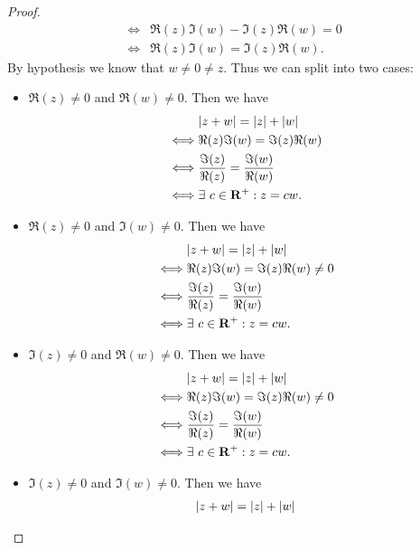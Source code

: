 \begin{proof}
\begin{align*}
        \iff & \Re(z) \Im(w) - \Im(z) \Re(w) = 0                                                                               \\
        \iff & \Re(z) \Im(w) = \Im(z) \Re(w).
    \end{align*}
    By hypothesis we know that \(w \neq 0 \neq z\).
    Thus we can split into two cases:
    \begin{itemize}
        \item \(\Re(z) \neq 0\) and \(\Re(w) \neq 0\).
              Then we have
              \begin{align*}
                       & \abs{z + w} = \abs{z} + \abs{w}               \\
                  \iff & \Re(z) \Im(w) = \Im(z) \Re(w)                 \\
                  \iff & \frac{\Im(z)}{\Re(z)} = \frac{\Im(w)}{\Re(w)} \\
                  \iff & \exists\ c \in \R^+ : z = cw.
              \end{align*}
        \item \(\Re(z) \neq 0\) and \(\Im(w) \neq 0\).
              Then we have
              \begin{align*}
                       & \abs{z + w} = \abs{z} + \abs{w}               \\
                  \iff & \Re(z) \Im(w) = \Im(z) \Re(w) \neq 0          \\
                  \iff & \frac{\Im(z)}{\Re(z)} = \frac{\Im(w)}{\Re(w)} \\
                  \iff & \exists\ c \in \R^+ : z = cw.
              \end{align*}
        \item \(\Im(z) \neq 0\) and \(\Re(w) \neq 0\).
              Then we have
              \begin{align*}
                       & \abs{z + w} = \abs{z} + \abs{w}               \\
                  \iff & \Re(z) \Im(w) = \Im(z) \Re(w) \neq 0          \\
                  \iff & \frac{\Im(z)}{\Re(z)} = \frac{\Im(w)}{\Re(w)} \\
                  \iff & \exists\ c \in \R^+ : z = cw.
              \end{align*}
        \item \(\Im(z) \neq 0\) and \(\Im(w) \neq 0\).
              Then we have
              \begin{align*}
                       & \abs{z + w} = \abs{z} + \abs{w}               \\

\end{align*}
\end{itemize}
\end{proof}
